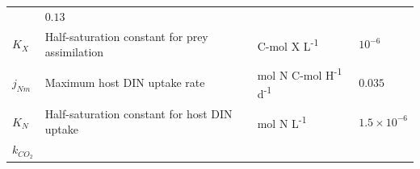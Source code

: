 \documentclass[]{elsarticle} %
\begin{document}
\begin{longtable}[]{@{}llll@{}}
\begin{minipage}[t]{0.24\columnwidth}
\end{minipage} & \begin{minipage}[t]{0.12\columnwidth}\raggedright\strut
\(0.13\)\strut
\end{minipage}\tabularnewline
\begin{minipage}[t]{0.09\columnwidth}\raggedright\strut
\(K_X\)\strut
\end{minipage} & \begin{minipage}[t]{0.44\columnwidth}\raggedright\strut
Half-saturation constant for prey assimilation\strut
\end{minipage} & \begin{minipage}[t]{0.24\columnwidth}\raggedright\strut
C-mol X L\textsuperscript{-1}\strut
\end{minipage} & \begin{minipage}[t]{0.12\columnwidth}\raggedright\strut
\(10^{-6}\)\strut
\end{minipage}\tabularnewline
\begin{minipage}[t]{0.09\columnwidth}\raggedright\strut
\(j_{Nm}\)\strut
\end{minipage} & \begin{minipage}[t]{0.44\columnwidth}\raggedright\strut
Maximum host DIN uptake rate\strut
\end{minipage} & \begin{minipage}[t]{0.24\columnwidth}\raggedright\strut
mol N C-mol H\textsuperscript{-1} d\textsuperscript{-1}\strut
\end{minipage} & \begin{minipage}[t]{0.12\columnwidth}\raggedright\strut
\(0.035\)\strut
\end{minipage}\tabularnewline
\begin{minipage}[t]{0.09\columnwidth}\raggedright\strut
\(K_N\)\strut
\end{minipage} & \begin{minipage}[t]{0.44\columnwidth}\raggedright\strut
Half-saturation constant for host DIN uptake\strut
\end{minipage} & \begin{minipage}[t]{0.24\columnwidth}\raggedright\strut
mol N L\textsuperscript{-1}\strut
\end{minipage} & \begin{minipage}[t]{0.12\columnwidth}\raggedright\strut
\(1.5\times 10^{-6}\)\strut
\end{minipage}\tabularnewline
\begin{minipage}[t]{0.09\columnwidth}\raggedright\strut
\(k_{CO_2}\)\strut

\end{minipage}
\end{longtable}
\end{document}
